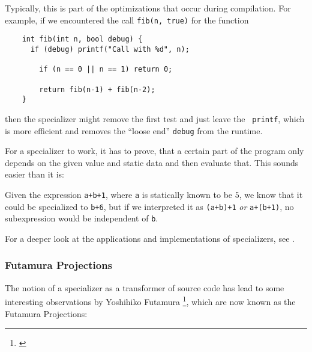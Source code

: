 Typically, this is part of the optimizations that occur during compilation. For
example, if we encountered the call {\tt fib(n, true)} for the function

\begin{verbatim}
	int fib(int n, bool debug) {
	  if (debug) printf("Call with %d", n);

	 	if (n == 0 || n == 1) return 0;

	 	return fib(n-1) + fib(n-2);
	}
\end{verbatim}
then the specializer might remove the first test and just leave the {\tt 
printf}, which is more efficient and removes the ``loose end'' {\tt debug}  
from the runtime.

For a specializer to work, it has to prove, that a certain part of the 
program only depends on the given value and static data and then evaluate 
that. This sounds easier than it is: 
\begin{example}
	Given the expression {\tt a+b+1}, where {\tt a} is statically known to be $5$, 
	we know that it could be specialized to {\tt b+6}, but if we interpreted it 
	as {\tt (a+b)+1} \emph{or} {\tt a+(b+1)}, no subexpression would be
	independent of {\tt b}.
\end{example}
For a deeper look at the applications and implementations of specializers, 
see \cite{jones1993partial}.


\subsubsection{Futamura Projections} %
\label{ssub:Futamura Projections}
The notion of a specializer as a transformer of source code has lead to some 
interesting observations by Yoshihiko Futamura
\footnote{\cite{futamura1999partial}}, which are now known as the Futamura
Projections:

